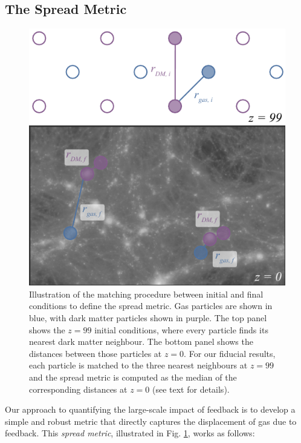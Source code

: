\documentclass[fleqn,usenatbib]{mnras}
\begin{document}
\subsection{The Spread Metric}

\begin{figure}
    \centering
    \includegraphics[width=\columnwidth]{figures/kspafig_small.pdf}
    \vspace{-0.5cm}
    \caption{Illustration of the matching procedure between initial and final
    conditions to define the spread metric. Gas particles are shown in
    blue, with dark matter particles shown in purple. The top panel shows the
    $z=99$ initial conditions, where every particle finds its nearest dark
    matter neighbour. The bottom panel shows the distances between those
    particles at $z=0$. For our fiducial results, each particle is matched to
    the three nearest neighbours at $z=99$ and the spread metric is computed
    as the median of the corresponding distances at $z=0$ (see text for
    details).}
    \label{fig:kspafigsmall}
\end{figure}

Our approach to quantifying the large-scale impact of feedback is to develop
a simple and robust metric that directly captures the displacement of gas
due to feedback. This {\it spread metric}, illustrated in Fig.
\ref{fig:kspafigsmall}, works as follows:
\end{document}
